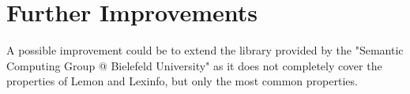 \section{Further Improvements}
\label{sec:improvements}

A possible improvement could be to extend the library provided by the "Semantic Computing Group @ Bielefeld University" as it does not completely cover the properties of Lemon and Lexinfo, but only the most common properties. 